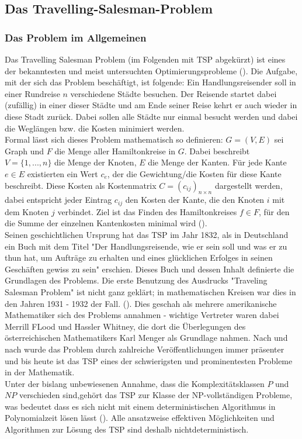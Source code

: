 \documentclass[doktyp=barbeit, sprache=german]{TUBAFarbeiten}
\begin{document}
\subsection{Das Travelling-Salesman-Problem}
\subsubsection{Das Problem im Allgemeinen}
Das Travelling Salesman Problem (im Folgenden mit TSP abgekürzt) ist eines der bekanntesten und meist untersuchten Optimierungsprobleme (\cite{TaschenbuchAlgorithmen}). Die Aufgabe, mit der sich das Problem beschäftigt, ist folgende: Ein Handlungsreisender soll in einer Rundreise \(n\) verschiedene Städte besuchen. Der Reisende startet dabei (zufällig) in einer dieser Städte und am Ende seiner Reise kehrt er auch wieder in diese Stadt zurück. Dabei sollen alle Städte nur einmal besucht werden und dabei die Weglängen bzw. die Kosten minimiert werden.\\Formal lässt sich dieses Problem mathematisch so definieren: $G = (V,E)$ sei Graph und $F$ die Menge aller Hamiltonkreise in $G$. Dabei beschreibt $V = \{1,...,n\}$ die Menge der Knoten, $E$ die Menge der Kanten. Für jede Kante $e \in E$ existierten ein Wert $c_e$, der die Gewichtung/die Kosten für diese Kante beschreibt. Diese Kosten als Kostenmatrix $C = (c_{ij})_{n\times n}$ dargestellt werden, dabei entspricht jeder Eintrag $c_{ij}$ den Kosten der Kante, die den Knoten $i$ mit dem Knoten $j$ verbindet. Ziel ist das Finden des Hamiltonkreises $f \in F$, für den die Summe der einzelnen Kantenkosten minimal wird (\cite{TSPVariations}).
\\Seinen geschichtlichen Ursprung hat das TSP im Jahr 1832, als in Deutschland ein Buch mit dem Titel "Der Handlungsreisende, wie er sein soll und was er zu thun hat, um Aufträge zu erhalten und eines glücklichen Erfolges in seinen Geschäften gewiss zu sein" erschien. Dieses Buch und dessen Inhalt definierte die Grundlagen des Problems.  Die erste Benutzung des Ausdrucks "Traveling Salesman Problem" ist nicht ganz geklärt; in mathematischen Kreisen war dies in den Jahren 1931 - 1932 der Fall. (\cite{TSP}). 
Dies geschah als mehrere amerikanische Mathematiker sich des Problems annahmen - wichtige Vertreter waren dabei Merrill FLood und Hassler Whitney, die dort die Überlegungen des österreichischen Mathematikers Karl Menger als Grundlage nahmen. Nach und nach wurde das Problem durch zahlreiche Veröffentlichungen immer präsenter und bis heute ist das TSP eines der schwierigsten und prominentesten Probleme in der Mathematik.
\\Unter der bislang unbewiesenen Annahme, dass die Komplexitätsklassen $P$ und $NP$ verschieden sind,gehört das TSP zur Klasse der NP-vollständigen Probleme, was bedeutet dass es sich nicht mit einem deterministischen Algorithmus in Polynomialzeit lösen lässt (\cite{Applegate2007}).  Alle ansatzweise effektiven Möglichkeiten und Algorithmen zur Lösung des TSP sind deshalb nichtdeterministisch. 
\end{document}
